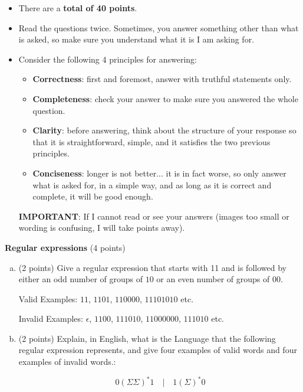 \documentclass[12pt]{article}
\newenvironment{question}[2][Question]{\begin{trivlist}
\item[\hskip \labelsep {\bfseries #1}\hskip \labelsep {\bfseries #2.}]}{\end{trivlist}}
\begin{document}
\begin{itemize}
    \item There are a \textbf{total of 40 points}.
    \item Read the questions twice. Sometimes, you answer something other than what is asked, so make sure you understand what it is I am asking for.
    \item Consider the following 4 principles for answering:
    \begin{itemize}
        \item \textbf{Correctness}: first and foremost, answer with truthful statements only.
        \item \textbf{Completeness}: check your answer to make sure you answered the whole question.
        \item \textbf{Clarity}: before answering, think about the structure of your response so that it is straightforward, simple, and it satisfies the two previous principles.
        \item \textbf{Conciseness}: longer is not better... it is in fact worse, so only answer what is asked for, in a simple way, and as long as it is correct and complete, it will be good enough.
    \end{itemize}

\textbf{IMPORTANT}: If I cannot read or see your answers (images too small or wording is confusing, I will take points away).
\end{itemize}


\bigskip



\clearpage


\begin{question}{1}\textbf{Regular expressions} (4 points)

\begin{enumerate}[(a)]
\item (2 points) Give a regular expression that starts with 11 and is followed by either an odd number of groups of $10$ or an even number of groups of $00$.

Valid Examples: $11$, $1101$, $110000$, $11101010$ etc.

Invalid Examples: $\epsilon$, $1100$, $111010$, $11000000$, $111010$ etc.


\vspace{16em}


\item (2 points) Explain, in English, what is the Language that the following regular expression represents, and give four examples of valid words and four examples of invalid words.:

$$0(\Sigma\Sigma)^*1 \quad|\quad 1(\Sigma)^*0$$



\end{enumerate}
\end{question}
\end{document}
